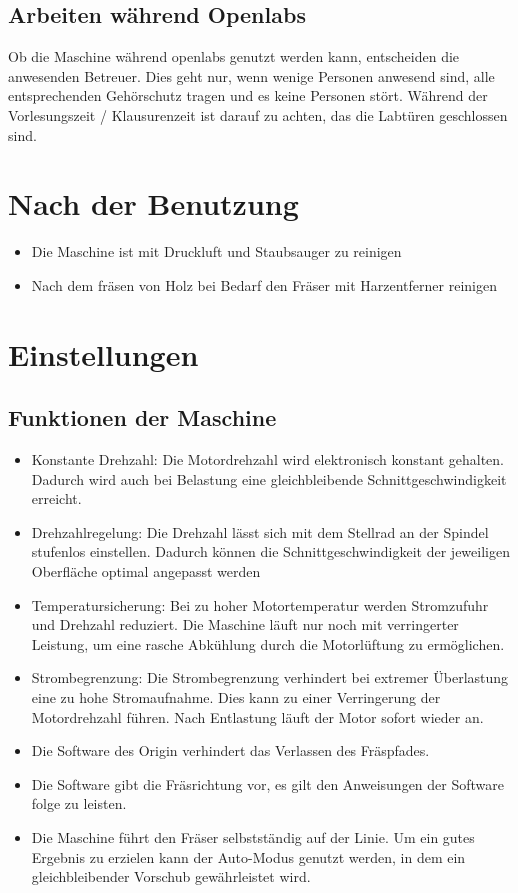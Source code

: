 \documentclass{\basedir/fablab-document}
\begin{document}
\subsection{Arbeiten während Openlabs}
Ob die Maschine während openlabs genutzt werden kann, entscheiden die anwesenden Betreuer. Dies geht nur, wenn wenige Personen anwesend sind, alle entsprechenden Gehörschutz tragen und es keine Personen stört. Während der Vorlesungszeit / Klausurenzeit ist darauf zu achten, das die Labtüren geschlossen sind.

\section{Nach der Benutzung}
\begin{itemize}
\item Die Maschine ist mit Druckluft und Staubsauger zu reinigen
\item Nach dem fräsen von Holz bei Bedarf den Fräser mit Harzentferner reinigen
\end{itemize}

\section{Einstellungen}
\subsection{Funktionen der Maschine}
\begin{itemize}
\item Konstante Drehzahl: Die Motordrehzahl wird elektronisch konstant gehalten. Dadurch wird auch bei Belastung eine gleichbleibende Schnittgeschwindigkeit erreicht.
\item Drehzahlregelung: Die Drehzahl lässt sich mit dem Stellrad an der Spindel stufenlos einstellen. Dadurch können die Schnittgeschwindigkeit der jeweiligen Oberfläche optimal angepasst werden
\item Temperatursicherung: Bei zu hoher Motortemperatur werden Stromzufuhr und Drehzahl reduziert. Die Maschine läuft nur noch mit verringerter Leistung, um eine rasche Abkühlung durch die Motorlüftung zu ermöglichen.
\item Strombegrenzung: Die Strombegrenzung verhindert bei extremer Überlastung eine zu hohe Stromaufnahme. Dies kann zu einer Verringerung der Motordrehzahl führen. Nach Entlastung läuft der Motor sofort wieder an.
\item Die Software des Origin verhindert das Verlassen des Fräspfades.
\item Die Software gibt die Fräsrichtung vor, es gilt den Anweisungen der Software folge zu leisten.
\item Die Maschine führt den Fräser selbstständig auf der Linie. Um ein gutes Ergebnis zu erzielen kann der Auto-Modus genutzt werden, in dem ein gleichbleibender Vorschub gewährleistet wird.
\end{itemize}
\end{document}
